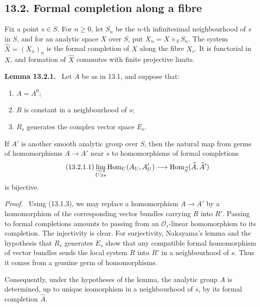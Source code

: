 \documentclass[11pt]{article}
\providecommand{\Hom}{\operatorname{Hom}}
\providecommand{\cO}{\mathcal O}
\newenvironment{statement}[1]{\par\medskip\noindent\textbf{#1.}\ }{\par\medskip}
\newenvironment{prooftext}{\par\noindent\emph{Proof.}\ }{\par\medskip}
\begin{document}
\subsection*{13.2. Formal completion along a fibre}

Fix a point \(s\in S\).  For \(n\geq 0\), let \(S_n\) be the \(n\)-th infinitesimal neighbourhood of \(s\) in \(S\), and for an analytic space \(X\) over \(S\), put \(X_n=X\times_S S_n\).  The system \(\widehat X=(X_n)_n\) is the formal completion of \(X\) along the fibre \(X_s\).  It is functorial in \(X\), and formation of \(\widehat X\) commutes with finite projective limits.

\begin{statement}{Lemma 13.2.1}
Let \(A\) be as in 13.1, and suppose that:
\begin{enumerate}[label=\alph*)]
\item \(A=A^0\);
\item \(R\) is constant in a neighbourhood of \(s\);
\item \(R_s\) generates the complex vector space \(E_s\).
\end{enumerate}
If \(A'\) is another smooth analytic group over \(S\), then the natural map from germs of homomorphisms \(A\to A'\) near \(s\) to homomorphisms of formal completions
\begin{equation}\tag{13.2.1.1}
        \varinjlim_{U\ni s}\Hom_U(A_U,A'_U)
        \longrightarrow
        \Hom_{\widehat S}(\widehat A,\widehat A')
\end{equation}
is bijective.
\end{statement}

\begin{prooftext}
Using (13.1.3), we may replace a homomorphism \(A\to A'\) by a homomorphism of the corresponding vector bundles carrying \(R\) into \(R'\).  Passing to formal completions amounts to passing from an \(\cO_s\)-linear homomorphism to its completion.  The injectivity is clear.  For surjectivity, Nakayama's lemma and the hypothesis that \(R_s\) generates \(E_s\) show that any compatible formal homomorphism of vector bundles sends the local system \(R\) into \(R'\) in a neighbourhood of \(s\).  Thus it comes from a genuine germ of homomorphisms.
\end{prooftext}

Consequently, under the hypotheses of the lemma, the analytic group \(A\) is determined, up to unique isomorphism in a neighbourhood of \(s\), by its formal completion \(\widehat A\).
\end{document}
